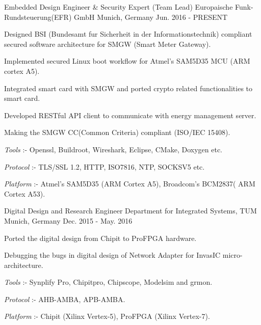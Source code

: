 

\begin{cventries}

  \cventry
    {Embedded Design Engineer \& Security Expert (Team Lead)} %
    {Europaische Funk-Rundsteuerung(EFR) GmbH} %
    {Munich, Germany} %
    {Jun. 2016 - PRESENT} %
    {
      \begin{cvitems} %
        \item {Designed BSI (Bundesamt fur Sicherheit in der Informationstechnik) compliant secured software architecture for SMGW (Smart Meter Gateway).}
        \item {Implemented secured Linux boot workflow for Atmel's SAM5D35 MCU (ARM cortex A5).}
        \item {Integrated smart card with SMGW and ported crypto related functionalities to smart card.}
        \item {Developed RESTful API client to communicate with energy management server.}
        \item {Making the SMGW CC(Common Criteria) compliant (ISO/IEC 15408).}
        \item {\textit{Tools} :- Openssl, Buildroot, Wireshark, Eclipse, CMake, Doxygen etc.}
        \item {\textit{Protocol} :- TLS/SSL 1.2, HTTP, ISO7816, NTP, SOCKSV5 etc.}
        \item {\textit{Platform} :- Atmel's SAM5D35 (ARM Cortex A5), Broadcom's BCM2837( ARM Cortex A53).}
      \end{cvitems}
    }

  \cventry
    {Digital Design and Research Engineer} %
    {Department for Integrated Systems, TUM} %
    {Munich, Germany} %
    {Dec. 2015 - May. 2016} %
    {
      \begin{cvitems} %
        \item {Ported the digital design from Chipit to ProFPGA hardware.}
        \item {Debugging the bugs in digital design of Network Adapter for InvasIC micro-architecture.}
        \item {\textit{Tools} :-  Synplify Pro, Chipitpro, Chipscope, Modelsim and grmon.}
        \item {\textit{Protocol} :- AHB-AMBA, APB-AMBA.}
        \item {\textit{Platform} :- Chipit (Xilinx Vertex-5), ProFPGA (Xilinx Vertex-7).}
      \end{cvitems}
    }


\end{cventries}

